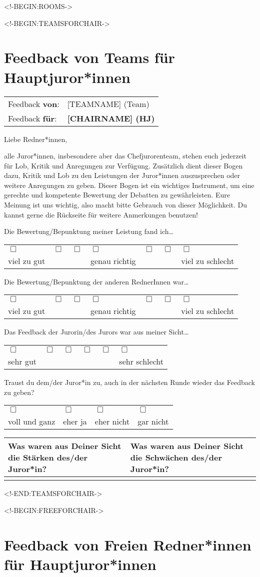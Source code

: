 \documentclass{scrartcl}
\newcommand{\questionsix}[3]{%
#3%

\medskip%

{%
  \centering%
  \begin{tabular}{>{\centering}p{0.13\textwidth}%
                  >{\centering}p{0.13\textwidth}%
                  >{\centering}p{0.13\textwidth}%
                  >{\centering}p{0.13\textwidth}%
                  >{\centering}p{0.13\textwidth}%
                  >{\centering\arraybackslash}p{0.13\textwidth}}%
    $\Box$ & $\Box$ & $\Box$ & $\Box$ & $\Box$ & $\Box$ \\%
    #1 & & & & & #2%
  \end{tabular}%
}%
}
\newcommand{\questionseven}[4]{%
#4%

\medskip%

{%
  \centering%
  \begin{tabular}{>{\centering}p{0.11\textwidth}%
                  >{\centering}p{0.11\textwidth}%
                  >{\centering}p{0.11\textwidth}%
                  >{\centering}p{0.11\textwidth}%
                  >{\centering}p{0.11\textwidth}%
                  >{\centering}p{0.11\textwidth}%
                  >{\centering\arraybackslash}p{0.11\textwidth}}%
    $\Box$ & $\Box$ & $\Box$ & $\Box$ & $\Box$ & $\Box$ & $\Box$ \\%
    #1 & & & #2 & & & #3%
  \end{tabular}%
}%
}
\newcommand{\questionfour}[1]{%
#1%

\medskip%

{%
  \centering%
  \begin{tabular}{>{\centering}p{0.23\textwidth}%
                  >{\centering}p{0.23\textwidth}%
                  >{\centering}p{0.23\textwidth}%
                  >{\centering\arraybackslash}p{0.23\textwidth}}%
    $\Box$ & $\Box$ & $\Box$ & $\Box$ \\%
    voll und ganz & eher ja & eher nicht & gar nicht %
  \end{tabular}%
}%
}
\newcommand{\strengthsandweaknesses}[1]{%
{%
  \centering%
  \begin{tabular}{|p{0.45\textwidth}|p{0.45\textwidth}|}%
    \hline%
    Was waren aus Deiner Sicht die Stärken des/der Juror*in? &%
    Was waren aus Deiner Sicht die Schwächen des/der Juror*in? \\%
    \hline%
    \bigskip & \\[#1]%
    \hline%
  \end{tabular}%
}%
}
\newcommand{\feedbackfromfor}[2]{%
\begin{tabular}{ll}%
  Feedback \textbf{von}: & #1 \\%
  Feedback \textbf{für}: & \textbf{#2}%
\end{tabular}%
}
\begin{document}
\setlength{\parindent}{0pt}

<!-BEGIN:ROOMS->

  \fancyhf{}

  <!-BEGIN:TEAMSFORCHAIR->
    \section*{Feedback von Teams für Hauptjuror*innen}

    \feedbackfromfor{[TEAMNAME] (Team)}{[CHAIRNAME] (HJ)}

    \bigskip

    Liebe Redner*innen,

    \medskip

    alle Juror*innen, insbesondere aber das Chefjurorenteam, stehen euch
    jederzeit für Lob, Kritik und Anregungen zur Verfügung. Zusätzlich dient
    dieser Bogen dazu, Kritik und Lob zu den Leistungen der Juror*innen
    auszusprechen oder weitere Anregungen zu geben. Dieser Bogen ist ein
    wichtiges Instrument, um eine gerechte und kompetente Bewertung der
    Debatten zu gewährleisten. Eure Meinung ist uns wichtig, also macht bitte
    Gebrauch von dieser Möglichkeit. Du kannst gerne die Rückseite für weitere
    Anmerkungen benutzen!

    \medskip
    \hrulefill
    \medskip

    \questionseven{viel zu gut}{genau richtig}{viel zu schlecht}{
      Die Bewertung/Bepunktung meiner Leistung fand ich\dots
    }
    \medskip

    \questionseven{viel zu gut}{genau richtig}{viel zu schlecht}{
      Die Bewertung/Bepunktung der anderen RednerInnen war\dots
    }
    \medskip

    \questionsix{sehr gut}{sehr schlecht}{
      Das Feedback der Jurorin/des Jurors war aus meiner Sicht\dots
    }
    \medskip

    \questionfour{
      Traust du dem/der Juror*in zu, auch in der nächsten Runde wieder das
      Feedback zu geben?
    }
    \medskip

    \strengthsandweaknesses{6cm}

    \newpage
  <!-END:TEAMSFORCHAIR->

  <!-BEGIN:FREEFORCHAIR->
    \section*{Feedback von Freien Redner*innen für Hauptjuror*innen}
\end{document}

